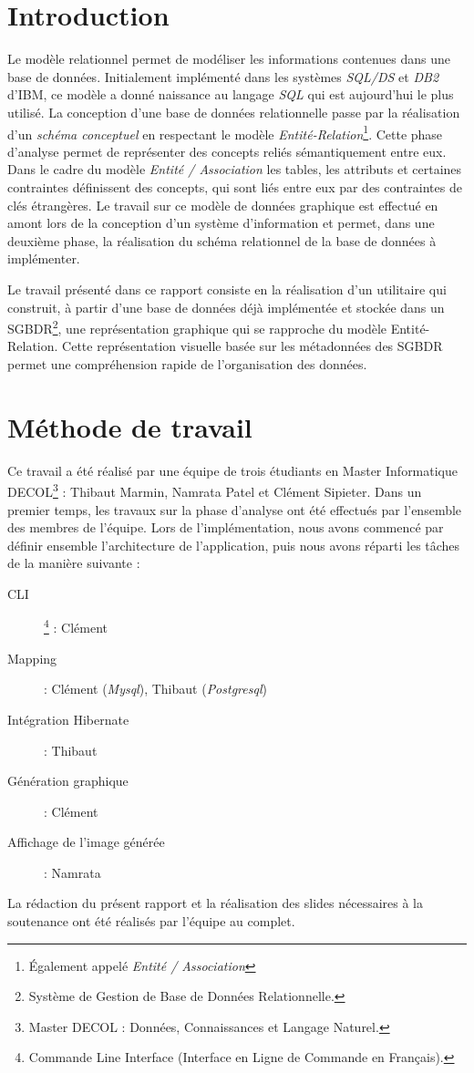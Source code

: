 \chapter*{Introduction}
Le modèle relationnel permet de modéliser les informations contenues dans une base de données. Initialement implémenté dans les systèmes \emph{SQL/DS} et \emph{DB2} d'IBM, ce modèle a donné naissance au langage \emph{SQL} qui est aujourd'hui le plus utilisé. La conception d'une base de données relationnelle passe par la réalisation d'un \emph{schéma conceptuel} en respectant le modèle  \emph{Entité-Relation}\footnote{Également appelé \emph{Entité / Association}}. Cette phase d'analyse permet de représenter des concepts reliés sémantiquement entre eux. Dans le cadre du modèle \emph{Entité / Association} les tables, les attributs et certaines contraintes définissent des concepts, qui sont liés entre eux par des contraintes de clés étrangères. Le travail sur ce modèle de données graphique est effectué en amont lors de la conception d'un système d'information et permet, dans une deuxième phase, la réalisation du schéma relationnel de la base de données à implémenter.

Le travail présenté dans ce rapport consiste en la réalisation d'un utilitaire qui construit, à partir d'une base de données déjà implémentée et stockée dans un SGBDR\footnote{Système de Gestion de Base de Données Relationnelle.}, une représentation graphique qui se rapproche du modèle Entité-Relation. Cette représentation visuelle basée sur les métadonnées des SGBDR permet une compréhension rapide de l'organisation des données.

\clearemptydoublepage
\chapter*{Méthode de travail}
Ce travail a été réalisé par une équipe de trois étudiants en Master Informatique DECOL\footnote{Master DECOL : Données, Connaissances et Langage Naturel.} : Thibaut Marmin, Namrata Patel et Clément Sipieter. Dans un premier temps, les travaux sur la phase d'analyse ont été effectués par l'ensemble des membres de l'équipe. Lors de l'implémentation, nous avons commencé par définir ensemble l'architecture de l'application, puis nous avons réparti les tâches de la manière suivante : 

\begin{description}
\item[CLI]\footnote{Commande Line Interface (\og Interface en Ligne de Commande \fg{} en Français).} : Clément
\item[Mapping] : Clément (\emph{Mysql}), Thibaut (\emph{Postgresql})
\item[Intégration Hibernate] : Thibaut
\item[Génération graphique] : Clément
\item[Affichage de l'image générée] : Namrata
\end{description}

La rédaction du présent rapport et la réalisation des slides nécessaires à la soutenance ont été réalisés par l'équipe au complet.
